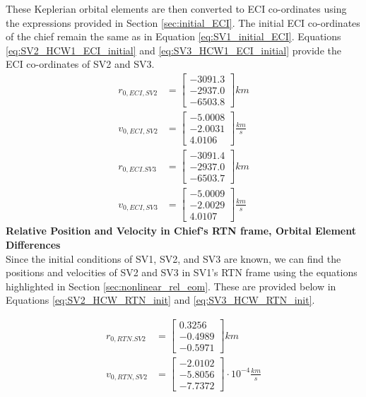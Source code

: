 These Keplerian orbital elements are then converted to ECI co-ordinates using the expressions provided in Section \ref{sec:initial_ECI}. The initial ECI co-ordinates of the chief remain the same as in Equation \ref{eq:SV1_initial_ECI}. Equations \ref{eq:SV2_HCW1_ECI_initial} and \ref{eq:SV3_HCW1_ECI_initial} provide the ECI co-ordinates of SV2 and SV3. 
\begin{align} \label{eq:SV2_HCW1_ECI_initial}
    r_{0, ECI, SV2} &= \begin{bmatrix}
        -3091.3 \\
        -2937.0 \\
        -6503.8
    \end{bmatrix} km \\
    v_{0, ECI, SV2} &= \begin{bmatrix}
        -5.0008 \\
        -2.0031 \\
        4.0106
    \end{bmatrix} \frac{km}{s}
\end{align}
\begin{align} \label{eq:SV3_HCW1_ECI_initial}
    r_{0, ECI. SV3} &= \begin{bmatrix}
        -3091.4 \\
        -2937.0 \\
        -6503.7
    \end{bmatrix} km \\
    v_{0, ECI, SV3} &= \begin{bmatrix}
        -5.0009 \\
        -2.0029 \\
        4.0107
    \end{bmatrix} \frac{km}{s}
\end{align}
\textbf{Relative Position and Velocity in Chief's RTN frame, Orbital Element Differences} \\
Since the initial conditions of SV1, SV2, and SV3 are known, we can find the positions and velocities of SV2 and SV3 in SV1's RTN frame using the equations highlighted in Section \ref{sec:nonlinear_rel_eom}. These are provided below in Equations \ref{eq:SV2_HCW_RTN_init} and \ref{eq:SV3_HCW_RTN_init}.

\begin{align} \label{eq:SV2_HCW_RTN_init}
    r_{0, RTN. SV2} &= \begin{bmatrix}
        0.3256 \\
        -0.4989 \\
        -0.5971
    \end{bmatrix} km \\
    v_{0, RTN, SV2} &= \begin{bmatrix}
        -2.0102 \\
        -5.8056 \\
        -7.7372
    \end{bmatrix}\cdot 10^{-4} \frac{km}{s}
\end{align}

